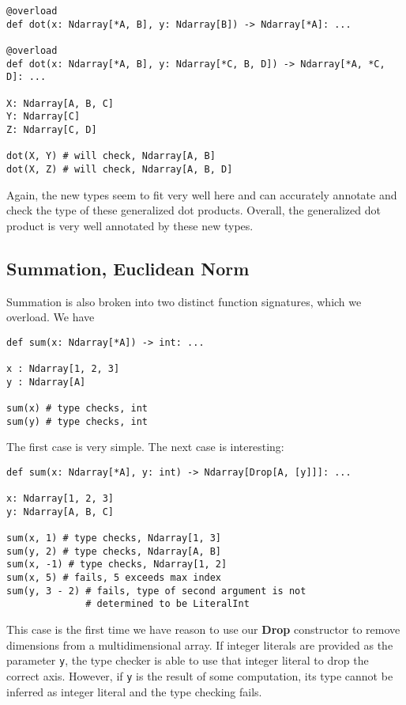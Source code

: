 \documentclass[12pt]{report}
\begin{document}
\begin{singlespace*}
\begin{verbatim}
@overload
def dot(x: Ndarray[*A, B], y: Ndarray[B]) -> Ndarray[*A]: ...

@overload
def dot(x: Ndarray[*A, B], y: Ndarray[*C, B, D]) -> Ndarray[*A, *C, D]: ...

X: Ndarray[A, B, C]
Y: Ndarray[C]
Z: Ndarray[C, D]

dot(X, Y) # will check, Ndarray[A, B]
dot(X, Z) # will check, Ndarray[A, B, D]\end{verbatim}
\end{singlespace*}
Again, the new types seem to fit very well here and can accurately annotate and check the type of these generalized dot products. Overall, the generalized dot product is very well annotated by these new types.

\subsection{Summation, Euclidean Norm}
Summation is also broken into two distinct function signatures, which we overload. We have

\begin{singlespace*}
    \begin{verbatim}
def sum(x: Ndarray[*A]) -> int: ...

x : Ndarray[1, 2, 3]
y : Ndarray[A]

sum(x) # type checks, int
sum(y) # type checks, int \end{verbatim}
\end{singlespace*}
The first case is very simple. The next case is interesting:

\begin{singlespace*}
    \begin{verbatim}
def sum(x: Ndarray[*A], y: int) -> Ndarray[Drop[A, [y]]]: ...

x: Ndarray[1, 2, 3]
y: Ndarray[A, B, C]

sum(x, 1) # type checks, Ndarray[1, 3]
sum(y, 2) # type checks, Ndarray[A, B]
sum(x, -1) # type checks, Ndarray[1, 2]
sum(x, 5) # fails, 5 exceeds max index
sum(y, 3 - 2) # fails, type of second argument is not
              # determined to be LiteralInt \end{verbatim}
\end{singlespace*}
This case is the first time we have reason to use our \textbf{Drop} constructor to remove dimensions from a multidimensional array. If integer literals are provided as the parameter \texttt{y}, the type checker is able to use that integer literal to drop the correct axis. However, if \texttt{y} is the result of some computation, its type cannot be inferred as integer literal and the type checking fails.
\end{document}
